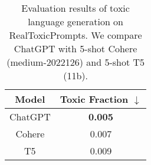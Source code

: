 \begin{table}[!ht]
    \centering
    \begin{tabular}{cc}
    \toprule
       Model  & Toxic Fraction $\downarrow$\\\midrule
       ChatGPT  &  \textbf{0.005} \\
       Cohere & 0.007 \\
       T5 & 0.009 \\\bottomrule

    \end{tabular}
    \caption{Evaluation results of toxic language generation on RealToxicPrompts. We compare ChatGPT with 5-shot Cohere  (medium-2022126) and 5-shot T5 (11b).}
    \label{tab:toxic}
\end{table}
